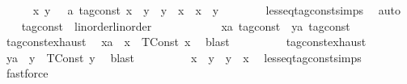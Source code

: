 \begin{isabellebody}
\ \ \ \ \isamarkupfalse%
\ {\isacartoucheopen}{\isasymAnd}x\ y\ \ {\isacharcolon}{\isacharcolon}\ {\isacharprime}a\ tag{\isacharunderscore}const{\isachardot}\ x\ {\isasymle}\ y\ {\isasymLongrightarrow}\ y\ {\isasymle}\ x\ {\isasymLongrightarrow}\ x\ {\isacharequal}\ y{\isacartoucheclose}\isanewline
\ \ \ \ \ \ \isamarkupfalse%
\ less{\isacharunderscore}eq{\isacharunderscore}tag{\isacharunderscore}const{\isachardot}simps\ \isamarkupfalse%
\ auto\isanewline
\ \ \isamarkupfalse%
%
\endisatagproof
{\isafoldproof}%
%
\isadelimproof
%
\endisadelimproof
\isanewline
\isanewline
{}\isamarkupfalse%
\isanewline
\isanewline
{}\isamarkupfalse%
\ tag{\isacharunderscore}const\ {\isacharcolon}{\isacharcolon}\ {\isacharparenleft}linorder{\isacharparenright}linorder\isanewline
{}\isanewline
\ \ \isamarkupfalse%
%
\isadelimproof
\ %
\endisadelimproof
%
\isatagproof
{}\isamarkupfalse%
\isanewline
\ \ \ \ \isacommand{{\isacharbraceleft}}\isamarkupfalse%
\ \isamarkupfalse%
\ x{\isacharcolon}{\isacharcolon}{\isacartoucheopen}{\isacharprime}a\ tag{\isacharunderscore}const{\isacartoucheclose}\ \ y{\isacharcolon}{\isacharcolon}{\isacartoucheopen}{\isacharprime}a\ tag{\isacharunderscore}const{\isacartoucheclose}\isanewline
\ \ \ \ \ \ \isamarkupfalse%
\ tag{\isacharunderscore}const{\isachardot}exhaust\ \isamarkupfalse%
\ xa\ \ {\isacartoucheopen}x\ {\isacharequal}\ TConst\ x\ \isamarkupfalse%
\ blast\isanewline
\ \ \ \ \ \ \isamarkupfalse%
\ \isamarkupfalse%
\ tag{\isacharunderscore}const{\isachardot}exhaust\ \isamarkupfalse%
\ ya\ \ {\isacartoucheopen}y\ {\isacharequal}\ TConst\ y\ \isamarkupfalse%
\ blast\isanewline
\ \ \ \ \ \ \isamarkupfalse%
\ \isamarkupfalse%
\ {\isacartoucheopen}x\ {\isasymle}\ y\ {\isasymor}\ y\ {\isasymle}\ x{\isacartoucheclose}\ \isamarkupfalse%
\ less{\isacharunderscore}eq{\isacharunderscore}tag{\isacharunderscore}const{\isachardot}simps\ \isamarkupfalse%
\ fastforce\isanewline
\ \ \ \ \isacommand{{\isacharbraceright}}\isamarkupfalse%

\end{isabellebody}
